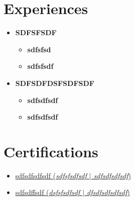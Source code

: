 \documentclass[letterpaper,5pt]{article}
\begin{document}
    
      
        \section{Experiences}
        \begin{itemize}[leftmargin=0.15in,label={}]
        
          \item{}
            \textbf{SDFSFSDF  \emph{}}  \hfill 
            \begin{itemize}
            \vspace{-5pt}
            \item[\textbullet{}]\textbf{sdfsfsd}  
            \vspace{-5pt}
            \item[\textbullet{}]\textbf{sdfsfsdf}      

            \end{itemize}
          
          \item{}
            \textbf{SDFSDFDSFSDFSDF  \emph{}}  \hfill 
            \begin{itemize}
            \vspace{-5pt}
            \item[\textbullet{}]\textbf{sdfsdfsdf}  
            \vspace{-5pt}
            \item[\textbullet{}]\textbf{sdfsdfsdf}      

            \end{itemize}
          
      \end{itemize}
      
    
    
        \section{Certifications}
          \begin{itemize}[leftmargin=0.45in,label={}]
          
              \item[\textbullet{}]\href{}{sdfsdfsdfsdf (\emph{sdfsfsdfsdf $|$ sdfsdfsdfsdf})} \faExternalLink
              \newline 
              \vspace{-20pt}
              \item[\textbullet{}]\href{}{sdfsdffsdf (\emph{dsfsfsdfsdf $|$ dfsdfsdfsdfsdf})} \faExternalLink
              \newline 
              \vspace{-20pt}
          \vspace{8pt}
          \end{itemize}
      
\end{document}
